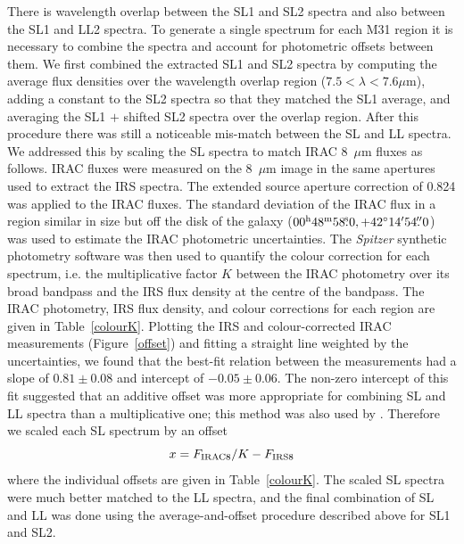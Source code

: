 There is wavelength overlap between the SL1 and SL2 spectra and also between the SL1 and LL2 spectra.
To generate a single spectrum for each M31 region it is necessary to combine the spectra and
account for photometric offsets between them. We first combined the extracted SL1 and SL2 
spectra by computing the average flux densities over the wavelength overlap region ($7.5 < \lambda< 7.6\mu$m),
adding a constant  to the SL2 spectra so that they matched the SL1 average,
and averaging the SL1 $+$ shifted SL2 spectra over the overlap region.
After this procedure there was still a noticeable mis-match between the SL and LL spectra. We addressed this
by scaling the SL spectra to match IRAC 8~$\mu$m fluxes as follows. IRAC fluxes were measured
on the 8~$\mu$m image \citep{Barmby2006lr} in the same apertures used to extract the IRS spectra.
The extended source  aperture correction of 0.824 was applied to the IRAC fluxes.
The standard deviation of the IRAC flux in a region similar in size but off the disk of the galaxy 
($00^{\rmn{h}}48^{\rmn{m}}58\fs0, +42\degr14\arcmin54\farcs0$) was used to estimate the
IRAC photometric uncertainties.
The {\em Spitzer} synthetic photometry software \citep{SpitzerDAC} 
was then used to quantify the colour correction for each spectrum, i.e. the
multiplicative factor $K$ between the IRAC photometry over its broad bandpass and the IRS flux
density at the centre of the bandpass. The IRAC photometry, IRS flux density, and colour corrections 
for each region are given in Table~\ref{colourK}. Plotting the IRS  and colour-corrected IRAC measurements
(Figure~\ref{offset}) and fitting a straight line weighted by the uncertainties, we found that the best-fit relation 
between the measurements had a slope of $0.81\pm0.08$  and intercept of $-0.05\pm0.06$. 
The non-zero intercept of this fit suggested that an additive offset was more appropriate for combining SL and LL
spectra than a multiplicative one; this method was also used by \citet{Sandstrom12}.
Therefore we scaled each SL spectrum by an offset 
\begin{equation}
x = F_{\rm IRAC8}/K -   F_{\rm IRS8}
\label{eq:offset}
\end{equation}
where the individual offsets are given in Table~\ref{colourK}.
The scaled SL spectra were much better matched to the LL spectra, and the final combination
of SL and LL was done using the average-and-offset procedure described above for SL1 and SL2.

